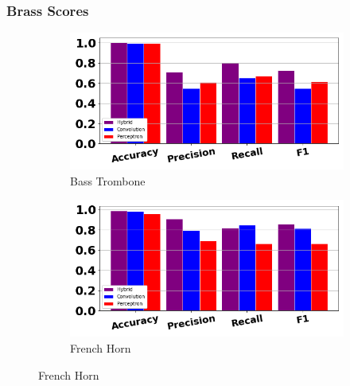 \documentclass[12pt,letterpaper]{article}
\begin{document}

\subsubsection{Brass Scores}

\begin{figure}[H]
	\begin{subfigure}[b]{0.45\textwidth}
	\centering
	\includegraphics[width=\textwidth]{../FiguresClasses/BassTrombone}
	\caption{Bass Trombone}
	\end{subfigure}	
	\hfill
	\begin{subfigure}[b]{0.45\textwidth}
	\centering
	\includegraphics[width=\textwidth]{../FiguresClasses/Horn}
	\caption{French Horn}
	\end{subfigure}	
	

\end{figure}
\end{document}
